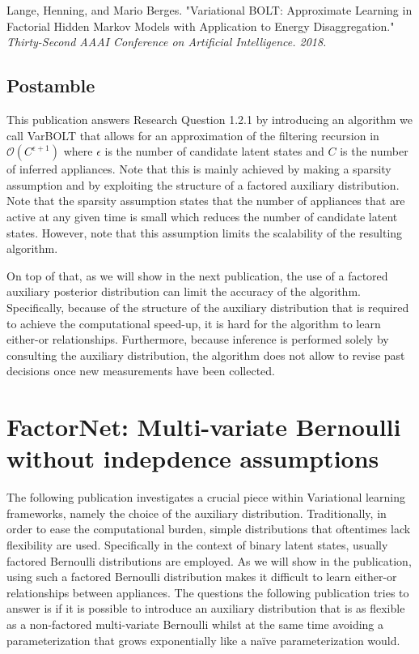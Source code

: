 \documentclass[11pt]{cmuthesis} %
\begin{document}
Lange, Henning, and Mario Berges. "Variational BOLT: Approximate Learning in Factorial Hidden Markov Models with Application to Energy Disaggregation." \emph{Thirty-Second AAAI Conference on Artificial Intelligence. 2018.}

\label{chapter:varbolt}


\newpage
\section{Postamble}

This publication answers Research Question 1.2.1 by introducing an algorithm we call VarBOLT that allows for an approximation of the filtering recursion in $\mathcal{O}(C^{\epsilon+1})$ where $\epsilon$ is the number of candidate latent states and $C$ is the number of inferred appliances. Note that this is mainly achieved by making a sparsity assumption and by exploiting the structure of a factored auxiliary distribution. Note that the sparsity assumption states that the number of appliances that are active at any given time is small which reduces the number of candidate latent states. However, note that this assumption limits the scalability of the resulting algorithm.

On top of that, as we will show in the next publication, the use of a factored auxiliary posterior distribution can limit the accuracy of the algorithm. Specifically, because of the structure of the auxiliary distribution that is required to achieve the computational speed-up, it is hard for the algorithm to learn either-or relationships. Furthermore, because inference is performed solely by consulting the auxiliary distribution, the algorithm does not allow to revise past decisions once new measurements have been collected.


\chapter{FactorNet: Multi-variate Bernoulli without indepdence assumptions}
\label{chapter:factornet}

The following publication investigates a crucial piece within Variational learning frameworks, namely the choice of the auxiliary distribution. Traditionally, in order to ease the computational burden, simple distributions that oftentimes lack flexibility are used. Specifically in the context of binary latent states, usually factored Bernoulli distributions are employed. As we will show in the publication, using such a factored Bernoulli distribution makes it difficult to learn either-or relationships between appliances. The questions the following publication tries to answer is if it is possible to introduce an auxiliary distribution that is as flexible as a non-factored multi-variate Bernoulli whilst at the same time avoiding a parameterization that grows exponentially like a na\"ive parameterization would.
\end{document}
